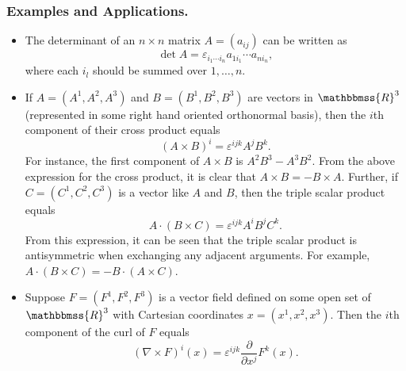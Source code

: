 \documentclass[12pt]{article}
\newcommand{\sR}[0]{\mathbbmss{R}}
\newcommand{\R}{\mathbbmss{R}}
\begin{document}
\subsubsection*{Examples and Applications.} 
\begin{itemize}
\item The determinant of an $n\times n$ matrix $A=(a_{ij})$ can be written
as
$$ \det A = \varepsilon_{i_1\cdots i_n} a_{1i_1} \cdots a_{ni_n},$$
where each $i_l$ should be summed over $1,\ldots, n$. 
\item If $A=(A^1, A^2, A^3)$ and $B=(B^1, B^2, B^3)$ are vectors in 
$\sR^3$ (represented in some right hand oriented orthonormal basis), then 
the $i$th component of their cross product equals
$$ (A\times B)^i = \varepsilon^{ijk} A^j B^k.$$
For instance, the first component of $A\times B$ is
$A^2 B^3-A^3 B^2$. From the above expression for the cross product, 
it is clear that $A\times B = -B\times A$. 
Further, if $C=(C^1, C^2, C^3)$ is a vector like $A$ and $B$, then 
the triple scalar product equals
$$ A\cdot(B\times C) = \varepsilon^{ijk} A^i B^j C^k.$$
From this expression, it can be seen that the triple scalar product is 
antisymmetric when exchanging any adjacent arguments.
For example, $A\cdot(B\times C)= -B\cdot(A\times C)$. 
\item Suppose $F=(F^1, F^2, F^3)$ is a vector field defined on some 
open set of $\R^3$ with Cartesian coordinates $x=(x^1, x^2, x^3)$. Then 
the $i$th component of the curl of $F$ equals
$$ 
  (\nabla \times F)^i(x) = \varepsilon^{ijk}\frac{\partial}{\partial x^j} F^k(x).
$$
\end{itemize}
\end{document}
